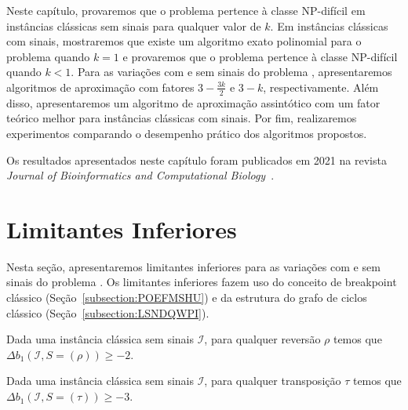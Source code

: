 Neste capítulo, provaremos que o problema \SbPRT{} pertence à classe NP-difícil em instâncias clássicas sem sinais para qualquer valor de $k$. Em instâncias clássicas com sinais, mostraremos que existe um algoritmo exato polinomial para o problema quando $k=1$ e provaremos que o problema pertence à classe NP-difícil quando $k < 1$. Para as variações com e sem sinais do problema \SbPRT{}, apresentaremos algoritmos de aproximação com fatores $3 - \frac{3k}{2}$ e $3-k$, respectivamente. Além disso, apresentaremos um algoritmo de aproximação assintótico com um fator teórico melhor para instâncias clássicas com sinais. Por fim, realizaremos experimentos comparando o desempenho prático dos algoritmos propostos.

Os resultados apresentados neste capítulo foram publicados em 2021 na revista \emph{Journal of Bioinformatics and Computational Biology}~\cite{2021a-brito-etal}.

\section{Limitantes Inferiores}

Nesta seção, apresentaremos limitantes inferiores para as variações com e sem sinais do problema \SbPRT{}. Os limitantes inferiores fazem uso do conceito de breakpoint clássico (Seção~\ref{subsection:POEFMSHU}) e da estrutura do grafo de ciclos clássico (Seção~\ref{subsection:LSNDQWPI}).

\begin{lemma}\label{lemma:QIRAVPQT}
Dada uma instância clássica sem sinais $\mathcal{I}$, para qualquer reversão $\rho$ temos que $\Delta b_1(\mathcal{I}, S = (\rho)) \ge -2$.
\end{lemma}

\begin{lemma}\label{lemma:NJATEDCC}
Dada uma instância clássica sem sinais $\mathcal{I}$, para qualquer transposição $\tau$ temos que $\Delta b_1(\mathcal{I}, S = (\tau)) \ge -3$.
\end{lemma}

